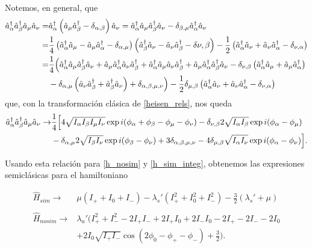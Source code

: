 Notemos, en general, que
\begin{equation}
\begin{split}
\hat{a}_{\alpha}^{\dagger}\hat{a}_{\beta}^{\dagger}\hat{a}_{\mu}\hat{a}_{\nu} =& \hat{a}_{\alpha}^{\dagger}\left( \hat{a}_{\mu}\hat{a}_{\beta}^{\dagger} - \delta_{\alpha,\beta} \right) \hat{a}_{\nu} = \hat{a}_{\alpha}^{\dagger}\hat{a}_{\mu}\hat{a}_{\beta}^{\dagger}\hat{a}_{\nu} - \delta_{\beta,\mu} \hat{a}_{\alpha}^{\dagger}\hat{a}_{\nu} \\
=& \frac{1}{4} \left( \hat{a}_{\alpha}^{\dagger}\hat{a}_{\mu} - \hat{a}_{\mu}\hat{a}_{\alpha}^{\dagger} -\delta_{\alpha,\mu} \right) \left( \hat{a}_{\beta}^{\dagger}\hat{a}_{\nu} - \hat{a}_{\nu}\hat{a}_{\beta}^{\dagger} - \delta{\nu,\beta} \right) - \frac{1}{2} \left( \hat{a}_{\alpha}^{\dagger}\hat{a}_{\nu} + \hat{a}_{\nu}\hat{a}_{\alpha}^{\dagger} - \delta_{\nu,\alpha} \right) \\
=& \frac{1}{4} \Big( \hat{a}_{\alpha}^{\dagger}\hat{a}_{\mu}\hat{a}_{\beta}^{\dagger}\hat{a}_{\nu} + \hat{a}_{\mu}\hat{a}_{\alpha}^{\dagger}\hat{a}_{\nu}\hat{a}_{\beta}^{\dagger} + \hat{a}_{\alpha}^{\dagger}\hat{a}_{\mu}\hat{a}_{\nu}\hat{a}_{\beta}^{\dagger} + \hat{a}_{\mu}\hat{a}_{\alpha}^{\dagger}\hat{a}_{\beta}^{\dagger}\hat{a}_{\nu} - \delta_{\nu,\beta} \left( \hat{a}_{\alpha}^{\dagger}\hat{a}_{\mu} + \hat{a}_{\mu}\hat{a}_{\alpha}^{\dagger} \right) \\ 
&- \delta_{\alpha,\mu} \left( \hat{a}_{\nu}\hat{a}_{\beta}^{\dagger} + \hat{a}_{\beta}^{\dagger}\hat{a}_{\nu} \right) + \delta_{\alpha,\beta,\mu,\nu} \Big) - \frac{1}{2} \delta_{\mu,\beta} \left( \hat{a}_{\alpha}^{\dagger}\hat{a}_{\nu} + \hat{a}_{\nu}\hat{a}_{\alpha}^{\dagger} - \delta_{\nu,\alpha} \right)  
\end{split}
\end{equation}
que, con la transformación clásica de \ref{heisen_rels}, nos queda
\begin{equation}
\begin{split}
\hat{a}_{\alpha}^{\dagger}\hat{a}_{\beta}^{\dagger}\hat{a}_{\mu}\hat{a}_{\nu} \to & \frac{1}{4} \Big[ 4 \sqrt{I_\alpha I_\beta I_\mu I_\nu}\exp{i ( \phi_\alpha + \phi_\beta - \phi_\mu - \phi_\nu ) } - \delta_{\nu,\beta} 2 \sqrt{I_\alpha I_\beta}\exp{ i (\phi_\alpha - \phi_\mu)} \\
&- \delta_{\alpha,\mu} 2 \sqrt{I_\beta I_\nu} \exp{i(\phi_\beta - \phi_\nu)} + 3 \delta_{\alpha,\beta,\mu,\nu} - 4 \delta_{\mu,\beta} \sqrt{I_\alpha I_\nu} \exp{i(\phi_\alpha - \phi_\nu)} \Big].
\end{split}
\end{equation}

Usando esta relación para \ref{h_nosim} y \ref{h_sim_integ}, obtenemos las expresiones semiclásicas para el hamiltoniano 

\begin{align}
\hat{H}_{sim} \to & \mu\left( I_+ + I_0 + I_- \right) - \lambda_s' \left(I_+^2 + I_0^2 + I_-^2 \right) - \frac{3}{2} \left(\lambda_s' + \mu \right) \\
\nonumber \\
\hat{H}_{nosim} \to & \lambda_a' \Big( I_+^2 + I_-^2 - 2I_+I_- + 2I_+I_0 + 2I_-I_0 - 2I_+ - 2 I_- -2I_0 \\
&+ 2I_0\sqrt{I_+I_-}\cos{(2\phi_0 - \phi_+ - \phi_-)} + \frac{3}{2} \Big). \nonumber
\end{align}

